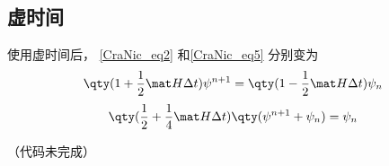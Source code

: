 \subsection{虚时间}
使用虚时间后， \autoref{CraNic_eq2} 和\autoref{CraNic_eq5} 分别变为
\begin{equation}
\qty(1+\frac12\mat H\Delta t)\psi^{n+1} = \qty(1-\frac12\mat H\Delta t)\psi_n
\end{equation}
\begin{equation}
\qty(\frac12 + \frac14\mat H\Delta t)\qty(\psi^{n+1}+\psi_n) = \psi_n
\end{equation}

（代码未完成）
